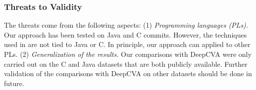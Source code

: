 \subsubsection{Threats to Validity}
The threats come from the following aspects: (1) \emph{Programming languages (PLs).}  Our approach has been tested on
Java and C commits. However, the techniques used in {\tool} are not
tied to Java or C.  In principle, our approach can applied to other PLs. (2) \emph{Generalization of the results.}  Our comparisons with
DeepCVA were only carried out on the C and Java datasets that are both publicly available.  Further validation of the comparisons with DeepCVA on other datasets should be done in future. 



